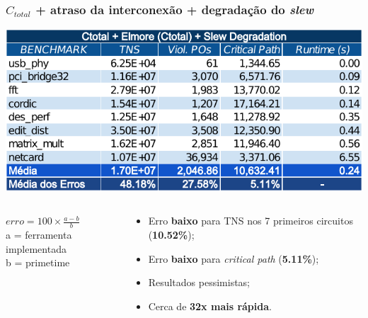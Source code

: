 \documentclass[10pt,a4paper]{beamer}
\begin{document}
		\begin{frame}[t]
			\frametitle{$C_{total}$ + atraso da interconexão + degradação do \textit{slew}}
			\vspace{-.5cm}
			\begin{center}
				\includegraphics[width=\linewidth]{img/lump_elmore_slew.pdf}
			\end{center}
			\begin{columns}
				\begin{column}{0.4\textwidth}
					\begin{shaded}
						$erro = 100 \times \frac{a - b}{ b } $ \\
						\small{a = ferramenta implementada} \\
						\small{b = primetime}
					\end{shaded}
				\end{column}
				\begin{column}{0.6\textwidth}
					\begin{small}
					
						\begin{itemize}
							\item Erro \textbf{baixo} para TNS nos 7 primeiros circuitos (\textbf{10.52\%});
							\item Erro \textbf{baixo} para \textit{critical path} (\textbf{5.11\%});
							\item Resultados pessimistas;
							\item Cerca de \textbf{32x mais rápida}.
						\end{itemize}
					\end{small}
				\end{column}
			\end{columns}			
			
		\end{frame}
		
		
		
\end{document}
